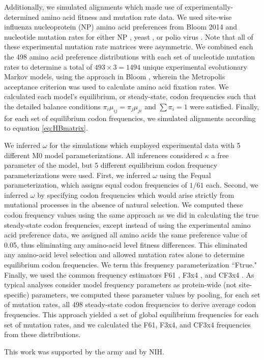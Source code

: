 \documentclass{pnastwo}
\begin{document}
\begin{article}
Additionally, we simulated alignments which made use of experimentally-determined amino acid fitness and mutation rate data. We used site-wise influenza nucleoprotein (NP) amino acid preferences from Bloom 2014 \cite{Bloom2014a} and nucleotide mutation rates for either NP \cite{Bloom2014a}, yeast \cite{Zhu2014}, or polio virus \cite{Acevedo2014}. Note that all of these experimental mutation rate matrices were asymmetric. We combined each the 498 amino acid preference distributions with each set of nucleotide mutation rates to determine a total of $493 \times 3 = 1494$ unique experimental evolutionary Markov models, using the approach in Bloom \cite{Bloom2014a}, wherein the Metropolis acceptance criterion \cite{Metropolis1953} was used to calculate amino acid fixation rates. We calculated each model's equilibrium, or steady-state, codon frequencies such that the detailed balance conditions $\pi_i\mu_{ij} = \pi_j\mu_{ji}$ and $\sum\pi_i = 1$ were satisfied. Finally, for each set of equilibrium codon frequencies, we simulated alignments according to equation \eqref{eq:HBmatrix}.

We inferred $\omega$ for the simulations which employed experimental data with 5 different M0 model parameterizations. All inferences considered $\kappa$ a free parameter of the model, but 5 different equilibrium codon frequency parameterizations were used. First, we inferred $\omega$ using the Fequal \cite{Yang2006} parameterization, which assigns equal codon frequencies of $1/61$ each. Second, we inferred $\omega$ by specifying codon frequencies which would arise strictly from mutational processes in the absence of natural selection. We computed these codon frequency values using the same approach as we did in calculating the true steady-state codon frequencies, except instead of using the experimental amino acid preference data, we assigned all amino acids the same preference value of 0.05, thus eliminating any amino-acid level fitness differences. This eliminated any amino-acid level selection and allowed mutation rates alone to determine equilibrium codon frequencies. We term this frequency parameterization ``Ftrue." Finally, we used the common frequency estimators F61 \cite{GoldmanYang1994}, F3x4 \cite{MuseGaut1994}, and CF3x4 \cite{Pond2010}. As typical analyses consider model frequency parameters as protein-wide (not site-specific) parameters, we computed these parameter values by pooling, for each set of mutation rates, all 498 steady-state codon frequencies to derive average codon frequencies. This approach yielded a set of global equilibrium frequencies for each set of mutation rates, and we calculated the F61, F3x4, and CF3x4 frequencies from these distributions.


\begin{acknowledgments}
This work was supported by the army and by NIH.
\end{acknowledgments}







\end{article}
	
\end{document}
